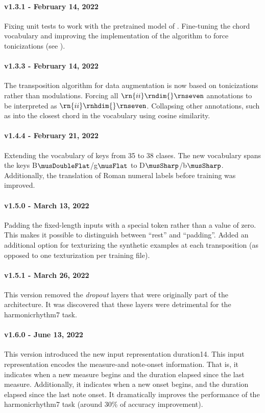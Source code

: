 \paragraph{v1.3.1 - February 14, 2022}
Fixing unit tests to work with the pretrained model of
. Fine-tuning the chord vocabulary and
improving the implementation of the algorithm to force
tonicizations (see ).

\paragraph{v1.3.3 - February 14, 2022}
The transposition algorithm for data augmentation is now
based on tonicizations rather than modulations. Forcing all
$\rn{ii}\rndim{}\rnseven$ annotations to be interpreted as
$\rn{ii}\rnhdim{}\rnseven$. Collapsing other annotations,
such as  into the closest chord in the vocabulary
using cosine similarity.

\paragraph{v1.4.4 - February 21, 2022}
Extending the vocabulary of keys from 35 to 38 clases. The
new vocabulary spans the keys B$\musDoubleFlat$/g$\musFlat$
to D$\musSharp$/b$\musSharp$. Additionally, the translation
of Roman numeral labels before training was improved.

\paragraph{v1.5.0 - March 13, 2022}
Padding the fixed-length inputs with a special token rather
than a value of zero. This makes it possible to distinguish
between ``rest'' and ``padding''. Added an additional option
for texturizing the synthetic examples at each transposition
(as opposed to one texturization per training file).

\paragraph{v1.5.1 - March 26, 2022}
This version removed the \emph{dropout} layers
\parencite{dahl2013improving} that were originally part of
the architecture. It was discovered that these layers were
detrimental for the \gls{harmonicrhythm7} task.

\paragraph{v1.6.0 - June 13, 2022}
This version introduced the new input representation
\gls{duration14}. This input representation encodes the
measure-and note-onset information. That is, it indicates
when a new measure begins and the duration elapsed since the
last measure. Additionally, it indicates when a new onset
begins, and the duration elapsed since the last note onset.
It dramatically improves the performance of the
\gls{harmonicrhythm7} task (around 30\% of accuracy
improvement).

